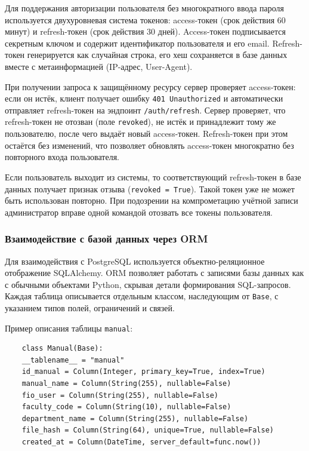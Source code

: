 Для поддержания авторизации пользователя без многократного ввода пароля используется двухуровневая система токенов: access-токен (срок действия 60 минут) и refresh-токен (срок действия 30 дней). Access-токен подписывается секретным ключом и содержит идентификатор пользователя и его email. Refresh-токен генерируется как случайная строка, его хеш сохраняется в базе данных вместе с метаинформацией (IP-адрес, User-Agent).

При получении запроса к защищённому ресурсу сервер проверяет access-токен: если он истёк, клиент получает ошибку \texttt{401 Unauthorized} и автоматически отправляет refresh-токен на эндпоинт \texttt{/auth/refresh}. Сервер проверяет, что refresh-токен не отозван (поле \texttt{revoked}), не истёк и принадлежит тому же пользователю, после чего выдаёт новый access-токен. Refresh-токен при этом остаётся без изменений, что позволяет обновлять access-токен многократно без повторного входа пользователя.

Если пользователь выходит из системы, то соответствующий refresh-токен в базе данных получает признак отзыва (\texttt{revoked = True}). Такой токен уже не может быть использован повторно. При подозрении на компрометацию учётной записи администратор вправе одной командой отозвать все токены пользователя.

\subsubsection{Взаимодействие с базой данных через ORM}

Для взаимодействия с PostgreSQL используется объектно-реляционное отображение SQLAlchemy. ORM позволяет работать с записями базы данных как с обычными объектами Python, скрывая детали формирования SQL-запросов. Каждая таблица описывается отдельным классом, наследующим от \texttt{Base}, с указанием типов полей, ограничений и связей.

Пример описания таблицы \texttt{manual}:

\begin{verbatim}
	class Manual(Base):
	__tablename__ = "manual"
	id_manual = Column(Integer, primary_key=True, index=True)
	manual_name = Column(String(255), nullable=False)
	fio_user = Column(String(255), nullable=False)
	faculty_code = Column(String(10), nullable=False)
	department_name = Column(String(255), nullable=False)
	file_hash = Column(String(64), unique=True, nullable=False)
	created_at = Column(DateTime, server_default=func.now())
\end{verbatim}

